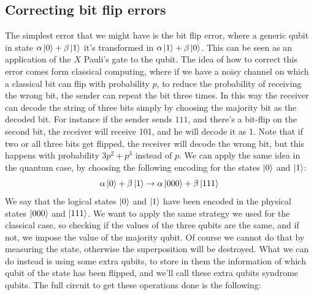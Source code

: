 \documentclass{article}
\begin{document}
	\subsection{Correcting bit flip errors}
	The simplest error that we might have is the bit flip error, where a generic qubit in state $\alpha\ket{0} + \beta\ket{1}$ it's transformed in $\alpha\ket{1} + \beta\ket{0}$. This can be seen as an application of the $X$ Pauli's gate to the qubit. The idea of how to correct this error comes form classical computing, where if we have a noisy channel on which a classical bit can flip with probability $p$, to reduce the probability of receiving the wrong bit, the sender can repeat the bit three times. In this way the receiver can decode the string of three bits simply by choosing the majority bit as the decoded bit. For instance if the sender sends $111$, and there's a bit-flip on the second bit, the receiver will receive 101, and he will decode it as 1. Note that if two or all three bits get flipped, the receiver will decode the wrong bit, but this happens with probability $3p^2 + p^3$ instead of $p$. We can apply the same idea in the quantum case, by choosing the following encoding for the states $\ket{0}$ and $\ket{1}$:
	\[ \alpha\ket{0} + \beta\ket{1} \rightarrow \alpha\ket{000} + \beta\ket{111}\]
	We say that the logical states $\ket{0}$ and $\ket{1}$ have been encoded in the physical states $\ket{000}$ and $\ket{111}$. We want to apply the same strategy we used for the classical case, so checking if the values of the three qubits are the same, and if not, we impose the value of the majority qubit. Of course we cannot do that by measuring the state, otherwise the superposition will be destroyed. What we can do instead is using some extra qubits, to store in them the information of which qubit of the state has been flipped, and we'll call these extra qubits syndrome qubits. The full circuit to get these operations done is the following:
\end{document}
